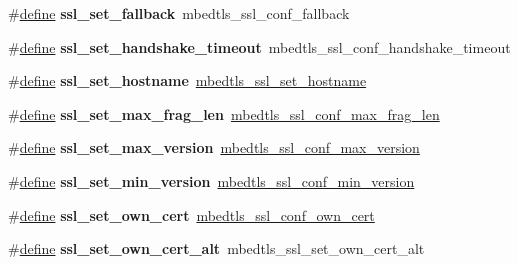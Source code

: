 \begin{DoxyCompactItemize}
\#\hyperlink{structdefine}{define} {\bfseries ssl\+\_\+set\+\_\+fallback}~mbedtls\+\_\+ssl\+\_\+conf\+\_\+fallback
\item 
\mbox{\label{compat-1_83_8h_a1aaee2b36f80c22844cad91fc5d5f088}} 
\#\hyperlink{structdefine}{define} {\bfseries ssl\+\_\+set\+\_\+handshake\+\_\+timeout}~mbedtls\+\_\+ssl\+\_\+conf\+\_\+handshake\+\_\+timeout
\item 
\mbox{\label{compat-1_83_8h_a19fc3e22f7764f8522dbff6a371b8ff8}} 
\#\hyperlink{structdefine}{define} {\bfseries ssl\+\_\+set\+\_\+hostname}~\hyperlink{ssl_8h_aa659024cf89e20d6d2248c0626db7ef2}{mbedtls\+\_\+ssl\+\_\+set\+\_\+hostname}
\item 
\mbox{\label{compat-1_83_8h_a89f74960d63a17aeed3ae9c6e29771d9}} 
\#\hyperlink{structdefine}{define} {\bfseries ssl\+\_\+set\+\_\+max\+\_\+frag\+\_\+len}~\hyperlink{ssl_8h_ac68fda83c26b3078e80f4dfc3b09bb94}{mbedtls\+\_\+ssl\+\_\+conf\+\_\+max\+\_\+frag\+\_\+len}
\item 
\mbox{\label{compat-1_83_8h_aa409773310e237ba18a27c98a856996b}} 
\#\hyperlink{structdefine}{define} {\bfseries ssl\+\_\+set\+\_\+max\+\_\+version}~\hyperlink{ssl_8h_afc1a81e3fcbea3045b41ce739a47f54e}{mbedtls\+\_\+ssl\+\_\+conf\+\_\+max\+\_\+version}
\item 
\mbox{\label{compat-1_83_8h_a06d39c56d5722ad2d7b98a68d0606d7a}} 
\#\hyperlink{structdefine}{define} {\bfseries ssl\+\_\+set\+\_\+min\+\_\+version}~\hyperlink{ssl_8h_a0eade5c83cc08001672061c5925caaaa}{mbedtls\+\_\+ssl\+\_\+conf\+\_\+min\+\_\+version}
\item 
\mbox{\label{compat-1_83_8h_af98b99cb2c947f22bbbf3ea835d0dee2}} 
\#\hyperlink{structdefine}{define} {\bfseries ssl\+\_\+set\+\_\+own\+\_\+cert}~\hyperlink{ssl_8h_a4e54e9ace21beb608bae36ddb81a4fb0}{mbedtls\+\_\+ssl\+\_\+conf\+\_\+own\+\_\+cert}
\item 
\mbox{\label{compat-1_83_8h_a7b557aff29461a866f33de6af639354b}} 
\#\hyperlink{structdefine}{define} {\bfseries ssl\+\_\+set\+\_\+own\+\_\+cert\+\_\+alt}~mbedtls\+\_\+ssl\+\_\+set\+\_\+own\+\_\+cert\+\_\+alt
\item 
\mbox{\label{compat-1_83_8h_a343b623d24a41dd247f84f816d9e5cef}} 

\end{DoxyCompactItemize}
